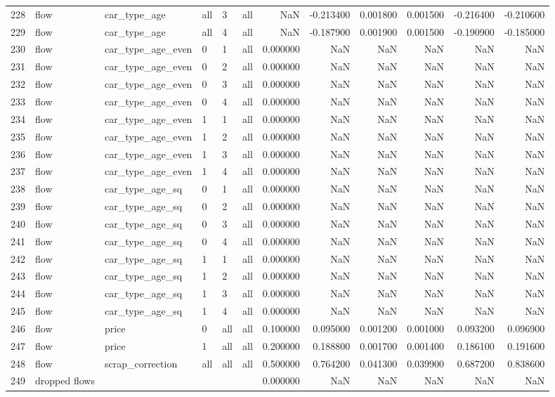 \begin{tabular}{llllllrrrrrr}
228 & flow & car_type_age & all & 3 & all & NaN & -0.213400 & 0.001800 & 0.001500 & -0.216400 & -0.210600 \\
229 & flow & car_type_age & all & 4 & all & NaN & -0.187900 & 0.001900 & 0.001500 & -0.190900 & -0.185000 \\
230 & flow & car_type_age_even & 0 & 1 & all & 0.000000 & NaN & NaN & NaN & NaN & NaN \\
231 & flow & car_type_age_even & 0 & 2 & all & 0.000000 & NaN & NaN & NaN & NaN & NaN \\
232 & flow & car_type_age_even & 0 & 3 & all & 0.000000 & NaN & NaN & NaN & NaN & NaN \\
233 & flow & car_type_age_even & 0 & 4 & all & 0.000000 & NaN & NaN & NaN & NaN & NaN \\
234 & flow & car_type_age_even & 1 & 1 & all & 0.000000 & NaN & NaN & NaN & NaN & NaN \\
235 & flow & car_type_age_even & 1 & 2 & all & 0.000000 & NaN & NaN & NaN & NaN & NaN \\
236 & flow & car_type_age_even & 1 & 3 & all & 0.000000 & NaN & NaN & NaN & NaN & NaN \\
237 & flow & car_type_age_even & 1 & 4 & all & 0.000000 & NaN & NaN & NaN & NaN & NaN \\
238 & flow & car_type_age_sq & 0 & 1 & all & 0.000000 & NaN & NaN & NaN & NaN & NaN \\
239 & flow & car_type_age_sq & 0 & 2 & all & 0.000000 & NaN & NaN & NaN & NaN & NaN \\
240 & flow & car_type_age_sq & 0 & 3 & all & 0.000000 & NaN & NaN & NaN & NaN & NaN \\
241 & flow & car_type_age_sq & 0 & 4 & all & 0.000000 & NaN & NaN & NaN & NaN & NaN \\
242 & flow & car_type_age_sq & 1 & 1 & all & 0.000000 & NaN & NaN & NaN & NaN & NaN \\
243 & flow & car_type_age_sq & 1 & 2 & all & 0.000000 & NaN & NaN & NaN & NaN & NaN \\
244 & flow & car_type_age_sq & 1 & 3 & all & 0.000000 & NaN & NaN & NaN & NaN & NaN \\
245 & flow & car_type_age_sq & 1 & 4 & all & 0.000000 & NaN & NaN & NaN & NaN & NaN \\
246 & flow & price & 0 & all & all & 0.100000 & 0.095000 & 0.001200 & 0.001000 & 0.093200 & 0.096900 \\
247 & flow & price & 1 & all & all & 0.200000 & 0.188800 & 0.001700 & 0.001400 & 0.186100 & 0.191600 \\
248 & flow & scrap_correction & all & all & all & 0.500000 & 0.764200 & 0.041300 & 0.039900 & 0.687200 & 0.838600 \\
249 & dropped flows &  &  &  &  & 0.000000 & NaN & NaN & NaN & NaN & NaN \\
\bottomrule
\end{tabular}
